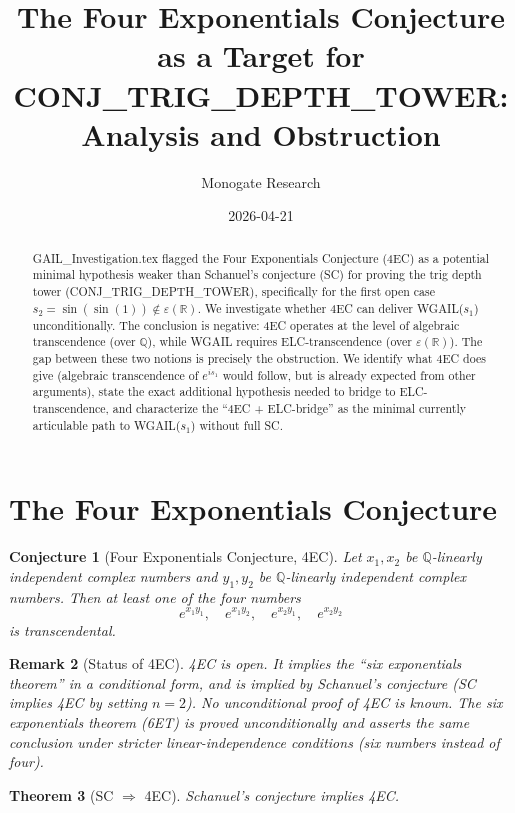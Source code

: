 \documentclass[11pt]{article}
\title{The Four Exponentials Conjecture as a Target for\\
CONJ\_TRIG\_DEPTH\_TOWER: Analysis and Obstruction}
\author{Monogate Research}
\date{2026-04-21}
\newtheorem{theorem}{Theorem}
\newtheorem{conjecture}[theorem]{Conjecture}
\newtheorem{remark}[theorem]{Remark}
\begin{document}
\maketitle

\begin{abstract}
GAIL\_Investigation.tex flagged the Four Exponentials Conjecture (4EC) as a
potential minimal hypothesis weaker than Schanuel's conjecture (SC) for
proving the trig depth tower (CONJ\_TRIG\_DEPTH\_TOWER), specifically for
the first open case $s_2 = \sin(\sin(1)) \notin \varepsilon(\mathbb{R})$.
We investigate whether 4EC can deliver WGAIL($s_1$) unconditionally.
The conclusion is negative: 4EC operates at the level of algebraic transcendence
(over $\mathbb{Q}$), while WGAIL requires ELC-transcendence (over $\varepsilon(\mathbb{R})$).
The gap between these two notions is precisely the obstruction.
We identify what 4EC does give (algebraic transcendence of $e^{is_1}$ would follow,
but is already expected from other arguments), state the exact additional hypothesis
needed to bridge to ELC-transcendence, and characterize the ``4EC + ELC-bridge''
as the minimal currently articulable path to WGAIL($s_1$) without full SC.
\end{abstract}

\section{The Four Exponentials Conjecture}

\begin{conjecture}[Four Exponentials Conjecture, 4EC]
\label{conj:4ec}
Let $x_1, x_2$ be $\mathbb{Q}$-linearly independent complex numbers and
$y_1, y_2$ be $\mathbb{Q}$-linearly independent complex numbers.
Then at least one of the four numbers
\[
e^{x_1 y_1},\quad e^{x_1 y_2},\quad e^{x_2 y_1},\quad e^{x_2 y_2}
\]
is transcendental.
\end{conjecture}

\begin{remark}[Status of 4EC]
4EC is open. It implies the ``six exponentials theorem'' in a conditional form,
and is implied by Schanuel's conjecture (SC implies 4EC by setting $n=2$).
No unconditional proof of 4EC is known. The six exponentials theorem (6ET)
is proved unconditionally and asserts the same conclusion under stricter
linear-independence conditions (six numbers instead of four).
\end{remark}

\begin{theorem}[SC $\Rightarrow$ 4EC]
Schanuel's conjecture implies 4EC.
\end{theorem}
\end{document}
